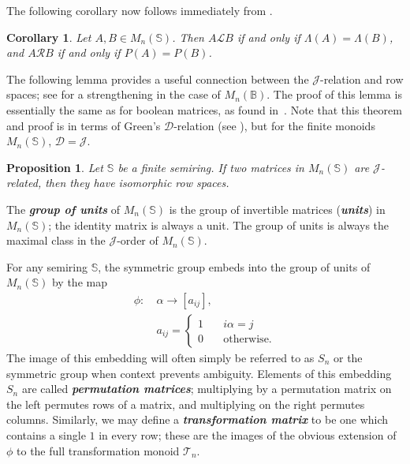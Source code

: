 \documentclass[11pt]{article}
\newtheorem{prop}[thm]{Proposition}
\newtheorem{cor}[thm]{Corollary}
\newcommand{\defn}[1]{\textbf{\textit{#1}}}
\numberwithin{equation}{section}
\renewcommand{\to}{\longrightarrow}
\newcommand{\B}{\mathbb{B}}
\newcommand{\Bn}{M_n(\B)}
\renewcommand{\L}{\mathscr{L}}
\newcommand{\R}{\mathscr{R}}
\newcommand{\D}{\mathscr{D}}
\newcommand{\J}{\mathscr{J}}
\newcommand{\RowS}{\Lambda}
\newcommand{\ColS}{P}
\begin{document}
The following corollary now follows immediately from .

\begin{cor} 
  Let $A, B \in M_n(\mathbb{S})$. Then $A \L B$ if and only if $\RowS(A) =
  \RowS(B)$, and $A \R B$ if and only if $\ColS(A) = \ColS(B)$. 
\end{cor}

The following lemma provides a useful connection between the $\J$-relation and row
spaces; see  for a strengthening in the case of $\Bn$.
The proof of this lemma is essentially the same as for boolean matrices,
as found in~\cite[Theorem 1.3.3, forward direction]{Kim1982aa}. Note that this
theorem and proof is in terms of Green's $\D$-relation (see \cite{Howie1995aa}),
but for the finite monoids $M_{n}(\mathbb{S})$, $\D = \J$.
\begin{prop}
  Let $\mathbb{S}$ be a finite semiring. If two matrices in
  $M_{n}(\mathbb{S})$ are $\J$-related, then they have isomorphic row spaces.
\end{prop}

The \defn{group of units} of $M_n(\mathbb{S})$ is the group of invertible
matrices (\defn{units}) in $M_n(\mathbb{S})$; the identity matrix is always a
unit. The group of units is always the maximal class in the $\J$-order of
$M_n(\mathbb{S})$.

For any semiring $\mathbb{S}$, the symmetric group embeds into the group of units of
$M_n(\mathbb{S})$ by the map 
\begin{align*}
  \phi:\: &\alpha \to [a_{ij}], \\
  &a_{ij} =
    \begin{cases}
      1 \quad & i\alpha = j \\ 
      0 \quad &\text{otherwise}.
    \end{cases}
\end{align*}
The image of this embedding will often simply be referred to as $S_n$ or the
symmetric group when context prevents ambiguity. Elements of this embedding
$S_n$ are called \defn{permutation matrices}; multiplying by a permutation
matrix on the left permutes rows of a matrix, and multiplying on the right
permutes columns. Similarly, we may define a \defn{transformation matrix} to be
one which contains a single $1$ in every row; these are the images of the
obvious extension of $\phi$ to the full transformation monoid $\mathcal{T}_n$.
\end{document}
